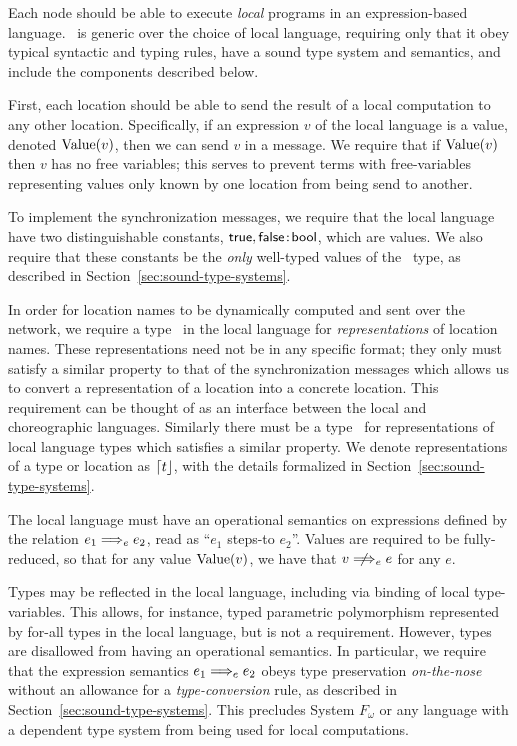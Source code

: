 Each node should be able to execute \emph{local} programs in an expression-based language.
\langname~is generic over the choice of local language, requiring only that it obey typical syntactic and typing rules, have a sound type system and semantics, and include the components described below.

First, each location should be able to send the result of a local computation to any other location.
Specifically, if an expression $v$ of the local language is a value, denoted $\text{Value}({v})$, then we can send $v$ in a message.
We require that if $\text{Value}({v})$ then $v$ has no free variables; this serves to prevent terms with free-variables representing values only known by one location from being send to another.

To implement the synchronization messages, we require that the local language have two distinguishable constants, $\mathsf{true}, \mathsf{false} \mkern2mu{:}\mkern2mu \mathsf{bool}$, which are values.
We also require that these constants be the \emph{only} well-typed values of the \Bool~type, as described in Section~\ref{sec:sound-type-systems}.

In order for location names to be dynamically computed and sent over the network, we require a type \Loc~in the local language for \emph{representations} of location names.
These representations need not be in any specific format; they only must satisfy a similar property to that of the synchronization messages which allows us to convert a representation of a location into a concrete location.
This requirement can be thought of as an interface between the local and choreographic languages.
Similarly there must be a type \Typ~for representations of local language types which satisfies a similar property.
We denote representations of a type or location as $\lceil t\rfloor$, with the details formalized in Section~\ref{sec:sound-type-systems}.

The local language must have an operational semantics on expressions defined by the relation $e_1 \localstep e_2$, read as ``$e_1$ steps-to $e_2$''.
Values are required to be fully-reduced, so that for any value $\text{Value}({v})$, we have that $v \nlocalstep e$ for any $e$.

Types may be reflected in the local language, including via binding of local type-variables.
This allows, for instance, typed parametric polymorphism represented by for-all types in the local language, but is not a requirement.
However, types are disallowed from having an operational semantics.
In particular, we require that the expression semantics $e_1 \localstep e_2$ obeys type preservation \emph{on-the-nose} without an allowance for a \emph{type-conversion} rule, as described in Section~\ref{sec:sound-type-systems}.
This precludes System $F_\omega$ or any language with a dependent type system from being used for local computations.

